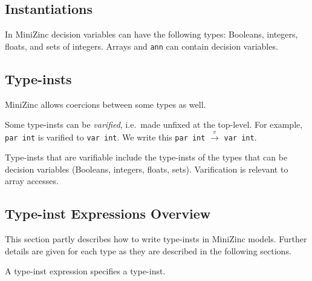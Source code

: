 \documentclass[10pt]{scrartcl}
\newcommand{\varify}[2]{#1 $\stackrel{v}{\rightarrow}$ #2}
\begin{document}
\subsection{Instantiations}
     \label{Instantiations}

In MiniZinc decision variables can have the following types: Booleans,
integers, floats, and sets of integers. %
Arrays and \texttt{ann} can contain decision variables.

\subsection{Type-insts}
     \label{Type-insts}
\CommonTypeInstDescription{}
MiniZinc allows coercions between some types as well.

Some type-insts can be \emph{varified}, i.e.~made unfixed at the top-level.
For example, \texttt{par int} is varified to \texttt{var int}.  We write this
\varify{\texttt{par int}}{\texttt{var int}}.

Type-insts that are varifiable include the type-insts of the types that can
be decision variables (Booleans, integers, floats, sets).
Varification is relevant to %
array accesses.

\subsection{Type-inst Expressions Overview}
     \label{Type-inst Expressions Overview}
This section partly describes how to write type-insts in MiniZinc models.
Further details are given for each type as they are described in the
following sections.

A type-inst expression specifies a type-inst.
\end{document}
